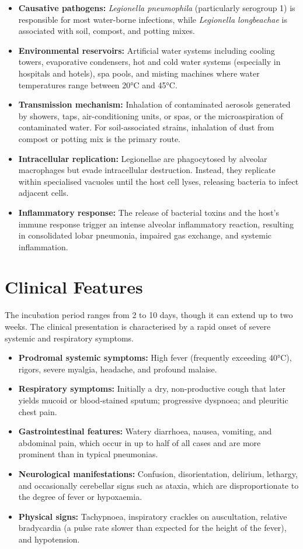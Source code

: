 \begin{itemize}
    \item \textbf{Causative pathogens:} \textit{Legionella pneumophila} (particularly serogroup 1) is responsible for most water-borne infections, while \textit{Legionella longbeachae} is associated with soil, compost, and potting mixes.
    \item \textbf{Environmental reservoirs:} Artificial water systems including cooling towers, evaporative condensers, hot and cold water systems (especially in hospitals and hotels), spa pools, and misting machines where water temperatures range between 20°C and 45°C.
    \item \textbf{Transmission mechanism:} Inhalation of contaminated aerosols generated by showers, taps, air-conditioning units, or spas, or the microaspiration of contaminated water. For soil-associated strains, inhalation of dust from compost or potting mix is the primary route.
    \item \textbf{Intracellular replication:} Legionellae are phagocytosed by alveolar macrophages but evade intracellular destruction. Instead, they replicate within specialised vacuoles until the host cell lyses, releasing bacteria to infect adjacent cells.
    \item \textbf{Inflammatory response:} The release of bacterial toxins and the host's immune response trigger an intense alveolar inflammatory reaction, resulting in consolidated lobar pneumonia, impaired gas exchange, and systemic inflammation.
\end{itemize}

\section*{Clinical Features}
The incubation period ranges from 2 to 10 days, though it can extend up to two weeks. The clinical presentation is characterised by a rapid onset of severe systemic and respiratory symptoms.

\begin{itemize}
    \item \textbf{Prodromal systemic symptoms:} High fever (frequently exceeding 40°C), rigors, severe myalgia, headache, and profound malaise.
    \item \textbf{Respiratory symptoms:} Initially a dry, non-productive cough that later yields mucoid or blood-stained sputum; progressive dyspnoea; and pleuritic chest pain.
    \item \textbf{Gastrointestinal features:} Watery diarrhoea, nausea, vomiting, and abdominal pain, which occur in up to half of all cases and are more prominent than in typical pneumonias.
    \item \textbf{Neurological manifestations:} Confusion, disorientation, delirium, lethargy, and occasionally cerebellar signs such as ataxia, which are disproportionate to the degree of fever or hypoxaemia.
    \item \textbf{Physical signs:} Tachypnoea, inspiratory crackles on auscultation, relative bradycardia (a pulse rate slower than expected for the height of the fever), and hypotension.
\end{itemize}


